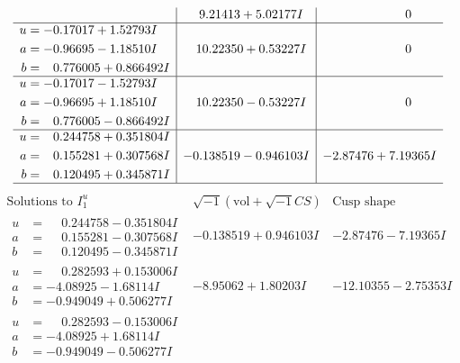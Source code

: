 \documentclass[1p]{elsarticle_modified}
\theoremstyle{definition}
\newcommand{\I}{\sqrt{-1}}
\begin{document}
$$\begin{array}{c|c|c}
 & \phantom{-}9.21413 + 5.02177 I & \phantom{-0.000000 } 0 \\ \hline\begin{aligned}
u &= -0.17017 + 1.52793 I \\
a &= -0.96695 - 1.18510 I \\
b &= \phantom{-}0.776005 + 0.866492 I\end{aligned}
 & \phantom{-}10.22350 + 0.53227 I & \phantom{-0.000000 } 0 \\ \hline\begin{aligned}
u &= -0.17017 - 1.52793 I \\
a &= -0.96695 + 1.18510 I \\
b &= \phantom{-}0.776005 - 0.866492 I\end{aligned}
 & \phantom{-}10.22350 - 0.53227 I & \phantom{-0.000000 } 0 \\ \hline\begin{aligned}
u &= \phantom{-}0.244758 + 0.351804 I \\
a &= \phantom{-}0.155281 + 0.307568 I \\
b &= \phantom{-}0.120495 + 0.345871 I\end{aligned}
 & -0.138519 - 0.946103 I & -2.87476 + 7.19365 I\\
 \hline 
 \end{array}$$\newpage$$\begin{array}{c|c|c}  
\text{Solutions to }I^u_{1}& \I (\text{vol} + \sqrt{-1}CS) & \text{Cusp shape}\\
 \hline 
\begin{aligned}
u &= \phantom{-}0.244758 - 0.351804 I \\
a &= \phantom{-}0.155281 - 0.307568 I \\
b &= \phantom{-}0.120495 - 0.345871 I\end{aligned}
 & -0.138519 + 0.946103 I & -2.87476 - 7.19365 I \\ \hline\begin{aligned}
u &= \phantom{-}0.282593 + 0.153006 I \\
a &= -4.08925 - 1.68114 I \\
b &= -0.949049 + 0.506277 I\end{aligned}
 & -8.95062 + 1.80203 I & -12.10355 - 2.75353 I \\ \hline\begin{aligned}
u &= \phantom{-}0.282593 - 0.153006 I \\
a &= -4.08925 + 1.68114 I \\
b &= -0.949049 - 0.506277 I\end{aligned}

\end{array}$$
\end{document}

